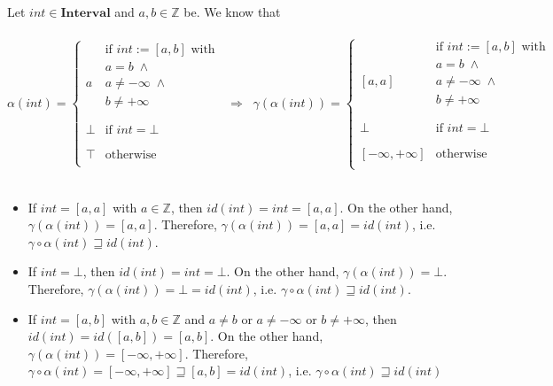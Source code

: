 \documentclass{article}
\newcommand{\interval}{\textbf{Interval}}
\newcommand{\zta}{\mathbb{Z}}
\begin{document}
Let $int \in \interval$ and $a,b \in \zta$ be. We know that\\\\
\begin{equation*}
    \alpha(int) = \left\{
\begin{array}{ll}
      & \text{if $int:= [a,b]$ with}\\
      & \text{$a = b \; \land$}\\
      a & \text{$a \neq - \infty \; \land$}\\
      & \text{$b \neq + \infty$}\\
      \\ \\
        \bot   & \text{if $int = \bot$}\\
      \\ \\
      \top & \text{otherwise} \\
\end{array} 
\right.
\;\; \Rightarrow \;\;
    \gamma(\alpha(int)) = \left\{
\begin{array}{ll}
      & \text{if $int:= [a,b]$ with}\\
      & \text{$a = b \; \land$}\\
      \left[ a , a \right] & \text{$a \neq - \infty \; \land$}\\
      & \text{$b \neq + \infty$}\\
      \\ \\
        \bot   & \text{if $int = \bot$}\\
      \\ \\
      \left[ -\infty, +\infty \right] & \text{otherwise} \\
\end{array} 
\right.
\end{equation*}\\
\begin{itemize}
    \item If $int = \left[ a , a \right]$ with $a \in \zta$, then $id(int) = int = \left[ a , a \right]$. On the other hand, $\gamma(\alpha(int)) = \left[ a , a \right]$. Therefore, $\gamma(\alpha(int)) = \left[ a , a \right] = id(int)$, i.e. $\gamma \circ \alpha(int) \sqsupseteq id(int)$.
    \item If $int = \bot$, then $id(int) = int = \bot$. On the other hand, $\gamma(\alpha(int)) = \bot$. Therefore, $\gamma(\alpha(int)) = \bot = id(int)$, i.e. $\gamma \circ \alpha(int) \sqsupseteq id(int)$.
    \item If $int = \left[ a , b \right]$ with $a,b \in \zta$ and $a \neq b$ or $a \neq - \infty$ or $b \neq + \infty$, then $id(int) = id(\left[ a , b \right]) = \left[ a , b \right]$. On the other hand, $\gamma(\alpha(int)) = \left[ -\infty, +\infty \right]$. Therefore, $\gamma \circ \alpha(int) = \left[ -\infty, +\infty \right] \sqsupseteq \left[ a , b \right] = id(int)$, i.e. $\gamma \circ \alpha(int) \sqsupseteq id(int)$
\end{itemize}\\
\end{document}
